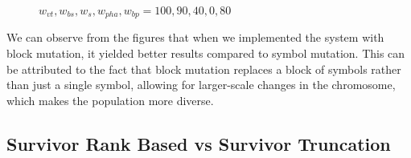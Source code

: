 \begin{figure}[H]
\begin{subfigure}[b]{0.1\textwidth}
    \end{subfigure}

    \vspace{0.5cm}
    \caption{$w_{vt}, w_{bs}, w_{s}, w_{pha}, w_{bp} = 100, 90, 40, 0, 80$}
    \label{fig:mutation_comparison1}
\end{figure}


We can observe from the figures that when we implemented the system with block mutation, it yielded better results compared to symbol mutation. This can be attributed to the fact that block mutation replaces a block of symbols rather than just a single symbol, allowing for larger-scale changes in the chromosome, which makes the population more diverse.


\subsection{Survivor Rank Based vs Survivor Truncation}

